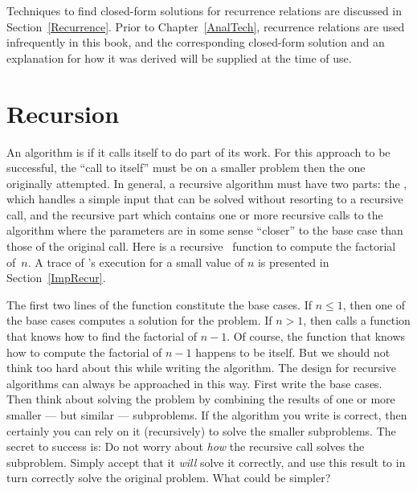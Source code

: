 Techniques to find closed-form solutions for recurrence relations are
discussed in Section~\ref{Recurrence}.
Prior to Chapter~\ref{AnalTech},
recurrence relations are used infrequently in this book, and
the corresponding closed-form solution and an explanation for how it
was derived will be supplied at the time of use.

\section{Recursion}
\label{Recurse}

An algorithm is  if it calls itself to do part of
its work.
For this approach to be successful, the ``call to itself'' must be on
a smaller problem then the one originally attempted.
In general, a recursive algorithm must have two parts:
the , which handles
a simple input that can be solved without resorting to a recursive
call, and the recursive part which contains one or more recursive
calls to the algorithm where the parameters are in some sense
``closer'' to the base case than those of the original call.
Here is a recursive \Lang\ function to compute the factorial
of~\(n\).
A trace of 's execution for a small value
of \(n\) is presented in Section~\ref{ImpRecur}.


The first two lines of the function constitute the base cases.
If \(n \leq 1\), then one of the base cases computes a solution for
the problem.
If \(n > 1\), then  calls a function that knows
how to find the factorial of \(n-1\).
Of course, the function that knows how to compute the factorial of
\(n-1\) happens to be  itself.
But we should not think too hard about this while writing the
algorithm.
The design for recursive algorithms can always be approached
in this way.
First write the base cases.
Then think about solving the problem by combining the results of one
or more smaller --- but similar --- subproblems.
If the algorithm you write is correct, then certainly you can rely on
it (recursively) to solve the smaller subproblems.
The secret to success is:
Do not worry about \emph{how} the recursive call solves the subproblem.
Simply accept that it \emph{will} solve it correctly, and use this
result to in turn correctly solve the original problem.
What could be simpler?

